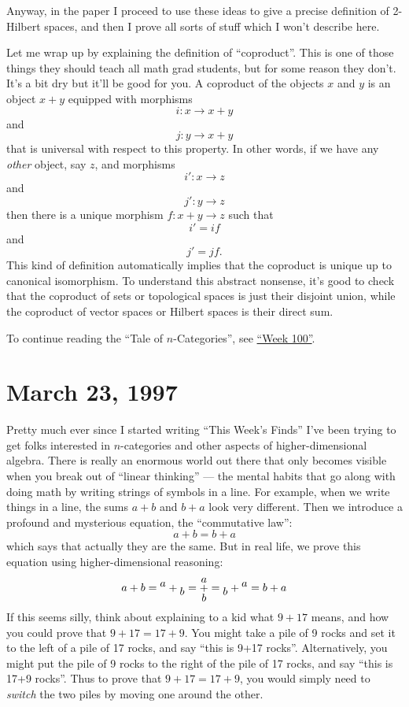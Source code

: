 \documentclass{article}
\begin{document}
Anyway, in the paper I proceed to use these ideas to give a precise
definition of 2-Hilbert spaces, and then I prove all sorts of stuff
which I won't describe here.

Let me wrap up by explaining the definition of ``coproduct''. This is
one of those things they should teach all math grad students, but for
some reason they don't. It's a bit dry but it'll be good for you. A
coproduct of the objects \(x\) and \(y\) is an object \(x+y\) equipped
with morphisms \[i\colon x \to x+y\] and \[j\colon y \to x+y\] that is
universal with respect to this property. In other words, if we have any
\emph{other} object, say \(z\), and morphisms \[i'\colon x \to z\] and
\[j'\colon y \to z\] then there is a unique morphism
\(f\colon x+y \to z\) such that \[i' = if\] and \[j' = jf.\] This kind
of definition automatically implies that the coproduct is unique up to
canonical isomorphism. To understand this abstract nonsense, it's good
to check that the coproduct of sets or topological spaces is just their
disjoint union, while the coproduct of vector spaces or Hilbert spaces
is their direct sum.

To continue reading the ``Tale of \(n\)-Categories'', see
\protect\hyperlink{week100}{``Week 100''}.
\hypertarget{week100}{%
\section{March 23, 1997}\label{week100}}

Pretty much ever since I started writing ``This Week's Finds'' I've been
trying to get folks interested in \(n\)-categories and other aspects of
higher-dimensional algebra. There is really an enormous world out there
that only becomes visible when you break out of ``linear thinking'' ---
the mental habits that go along with doing math by writing strings of
symbols in a line. For example, when we write things in a line, the sums
\(a+b\) and \(b+a\) look very different. Then we introduce a profound
and mysterious equation, the ``commutative law'': \[a + b = b + a\]
which says that actually they are the same. But in real life, we prove
this equation using higher-dimensional reasoning:
\[a+b = {}^{\mbox{\normalfont $a$}}+{}_{\mbox{\normalfont $b$}} = \underset{{\mbox{\normalfont $b$}}}{\overset{{\mbox{\normalfont $a$}}}{+}} = {}_{{\mbox{\normalfont $b$}}}+{}^{{\mbox{\normalfont $a$}}} = b+a\]
If this seems silly, think about explaining to a kid what \(9+17\)
means, and how you could prove that \(9+17 = 17+9\). You might take a
pile of 9 rocks and set it to the left of a pile of 17 rocks, and say
``this is 9+17 rocks''. Alternatively, you might put the pile of 9 rocks
to the right of the pile of 17 rocks, and say ``this is 17+9 rocks''.
Thus to prove that \(9+17=17+9\), you would simply need to \emph{switch}
the two piles by moving one around the other.
\end{document}
